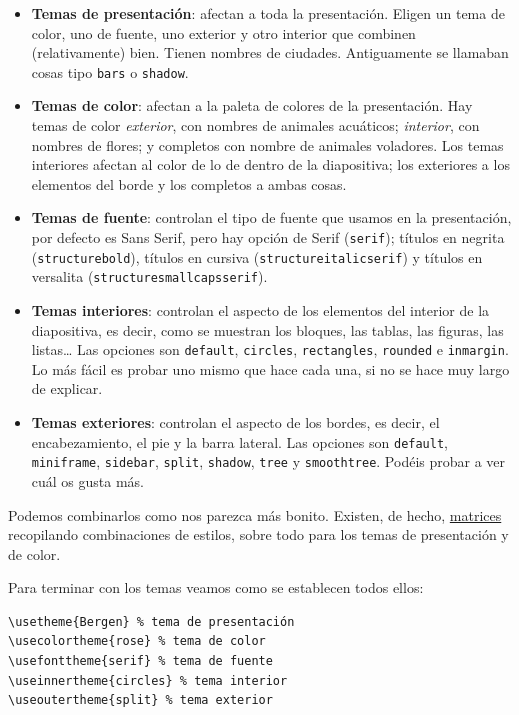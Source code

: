\begin{itemize}
\item
  \textbf{Temas de presentación}: afectan a toda la presentación. Eligen
  un tema de color, uno de fuente, uno exterior y otro interior que
  combinen (relativamente) bien. Tienen nombres de ciudades.
  Antiguamente se llamaban cosas tipo \lstinline!bars! o
  \lstinline!shadow!.
\item
  \textbf{Temas de color}: afectan a la paleta de colores de la
  presentación. Hay temas de color \emph{exterior}, con nombres de
  animales acuáticos; \emph{interior}, con nombres de flores; y
  completos con nombre de animales voladores. Los temas interiores
  afectan al color de lo de dentro de la diapositiva; los exteriores a
  los elementos del borde y los completos a ambas cosas.
\item
  \textbf{Temas de fuente}: controlan el tipo de fuente que usamos en la
  presentación, por defecto es Sans Serif, pero hay opción de Serif
  (\lstinline!serif!); títulos en negrita (\lstinline!structurebold!),
  títulos en cursiva (\lstinline!structureitalicserif!) y títulos en
  versalita (\lstinline!structuresmallcapsserif!).
\item
  \textbf{Temas interiores}: controlan el aspecto de los elementos del
  interior de la diapositiva, es decir, como se muestran los bloques,
  las tablas, las figuras, las listas\ldots{} Las opciones son
  \lstinline!default!, \lstinline!circles!, \lstinline!rectangles!,
  \lstinline!rounded! e \lstinline!inmargin!. Lo más fácil es probar uno
  mismo que hace cada una, si no se hace muy largo de explicar.
\item
  \textbf{Temas exteriores}: controlan el aspecto de los bordes, es
  decir, el encabezamiento, el pie y la barra lateral. Las opciones son
  \lstinline!default!, \lstinline!miniframe!, \lstinline!sidebar!,
  \lstinline!split!, \lstinline!shadow!, \lstinline!tree! y
  \lstinline!smoothtree!. Podéis probar a ver cuál os gusta más.
\end{itemize}

Podemos combinarlos como nos parezca más bonito. Existen, de hecho,
\href{https://hartwork.org/beamer-theme-matrix/}{matrices} recopilando
combinaciones de estilos, sobre todo para los temas de presentación y de
color.

Para terminar con los temas veamos como se establecen todos ellos:

\begin{lstlisting}[language={[latex]tex}]
% Preámbulo
\usetheme{Bergen} % tema de presentación
\usecolortheme{rose} % tema de color
\usefonttheme{serif} % tema de fuente
\useinnertheme{circles} % tema interior
\useoutertheme{split} % tema exterior
\end{lstlisting}

